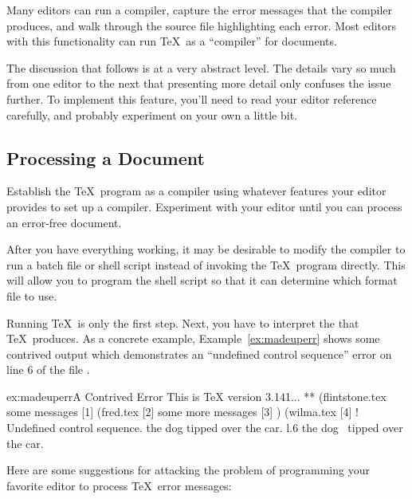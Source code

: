 Many editors can run a compiler, capture the error messages that the
compiler produces, and walk through the source file highlighting each
error.  Most editors with this functionality can run \TeX\ as a
``compiler'' for documents.  

The discussion that follows is at a very abstract level.  The details vary
so much from one editor to the next that presenting more detail only
confuses the issue further.  To implement this feature, you'll need to
read your editor reference carefully, and probably experiment on your
own a little bit.

\subsection{Processing a Document}

Establish the \TeX\ program as a compiler using whatever features your
editor provides to set up a compiler.  Experiment with your editor until
you can process an error-free document.

After you have everything working, it may be desirable to modify the
compiler to run a batch file or shell script instead of invoking the
\TeX\ program directly.  This will allow you to program the shell script
so that it can determine which format file to use.

Running \TeX\ is only the first step.  Next, you have to interpret the
  that \TeX\ produces.  
As a concrete example,
Example~\ref{ex:madeuperr} shows some contrived output which demonstrates
an ``undefined control sequence'' error on line 6 of the file
.

\begin{example}{ex:madeuperr}{A Contrived Error}
This is TeX version 3.141...
** (flintstone.tex
some
messages [1]
(fred.tex [2]
some more
messages
[3] ) (wilma.tex [4]
! Undefined control sequence.
the dog \dino
              tipped over the car.
l.6 the dog \dino\ tipped over the car.
\end{example}

Here are some suggestions for attacking the problem of programming
your favorite editor to process \TeX\ error 
messages:

